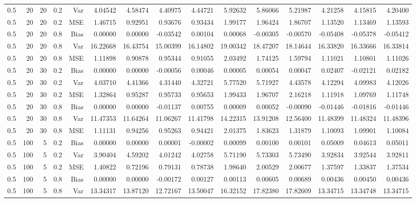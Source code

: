 \begin{table}[!htbp]
\begin{tabular}{lrrrrrrrrrrrrrr}
0.5 &  20 & 20 & 0.2 & Var & 4.04542 & 4.58474 & 4.40975 & 4.44721 & 5.92632 & 5.86066 & 5.21987 & 4.21258 & 4.15815 & 4.20400 \\
0.5 &  20 & 20 & 0.2 & MSE & 1.46715 & 0.92951 & 0.93676 & 0.93434 & 1.99177 & 1.96424 & 1.86707 & 1.13520 & 1.13469 & 1.13593 \\
0.5 &  20 & 20 & 0.8 & Bias & 0.00000 & 0.00000 & -0.03542 & 0.00104 & 0.00068 & -0.00305 & -0.00570 & -0.05408 & -0.05378 & -0.05412 \\
0.5 &  20 & 20 & 0.8 & Var & 16.22668 & 16.43754 & 15.00399 & 16.14802 & 19.00342 & 18.47207 & 18.14644 & 16.33820 & 16.33666 & 16.33814 \\
0.5 &  20 & 20 & 0.8 & MSE & 1.11898 & 0.90878 & 0.95344 & 0.91055 & 2.03492 & 1.74125 & 1.59794 & 1.11021 & 1.10801 & 1.11026 \\
0.5 &  20 & 30 & 0.2 & Bias & 0.00000 & 0.00000 & -0.00056 & 0.00046 & 0.00005 & 0.00054 & 0.00047 & 0.02407 & -0.02121 & 0.02182 \\
0.5 &  20 & 30 & 0.2 & Var & 4.03710 & 4.41366 & 4.31440 & 4.32721 & 5.77520 & 5.71927 & 4.43578 & 4.12294 & 4.09983 & 4.12026 \\
0.5 &  20 & 30 & 0.2 & MSE & 1.32864 & 0.95287 & 0.95733 & 0.95653 & 1.99433 & 1.96707 & 2.16218 & 1.11918 & 1.09769 & 1.11748 \\
0.5 &  20 & 30 & 0.8 & Bias & 0.00000 & 0.00000 & -0.01137 & 0.00755 & 0.00009 & 0.00052 & -0.00090 & -0.01446 & -0.01816 & -0.01446 \\
0.5 &  20 & 30 & 0.8 & Var & 11.47353 & 11.64264 & 11.06267 & 11.41798 & 14.22315 & 13.91208 & 12.56400 & 11.48399 & 11.48324 & 11.48396 \\
0.5 &  20 & 30 & 0.8 & MSE & 1.11131 & 0.94256 & 0.95263 & 0.94421 & 2.01375 & 1.83623 & 1.31879 & 1.10093 & 1.09901 & 1.10084 \\
0.5 & 100 &  5 & 0.2 & Bias & 0.00000 & 0.00000 & 0.00001 & -0.00002 & 0.00099 & 0.00100 & 0.00101 & 0.05009 & 0.04613 & 0.05011 \\
0.5 & 100 &  5 & 0.2 & Var & 3.90404 & 4.59202 & 4.01242 & 4.02758 & 5.71190 & 5.73303 & 5.73490 & 3.92834 & 3.92544 & 3.92811 \\
0.5 & 100 &  5 & 0.2 & MSE & 1.40822 & 0.72196 & 0.79131 & 0.78738 & 1.98640 & 2.00529 & 2.00677 & 1.37597 & 1.33837 & 1.37534 \\
0.5 & 100 &  5 & 0.8 & Bias & 0.00000 & 0.00000 & -0.00172 & 0.00127 & 0.00113 & 0.00605 & 0.00689 & 0.00436 & 0.00450 & 0.00436 \\
0.5 & 100 &  5 & 0.8 & Var & 13.34317 & 13.87120 & 12.72167 & 13.50047 & 16.32152 & 17.82380 & 17.82609 & 13.34715 & 13.34748 & 13.34715 \\

\end{tabular}
\end{table}
